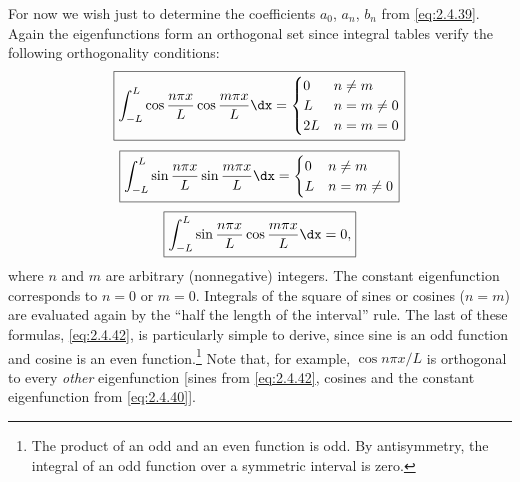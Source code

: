 For now we wish just to determine the coefficients $a_0$, $a_n$, $b_n$ from \eqref{eq:2.4.39}. Again the eigenfunctions form an orthogonal set since integral tables verify the following orthogonality conditions:
\begin{equation}
\label{eq:2.4.40}
\boxed{\int_{-L}^{L} \cos\frac{n\pi x}{L}\cos\frac{m\pi x}{L}\dx = \begin{cases} 0 & n \ne m \\ L & n = m \ne 0 \\ 2L & n = m = 0 \end{cases}}
\end{equation}
\begin{equation}
\label{eq:2.4.41}
\boxed{\int_{-L}^{L} \sin\frac{n\pi x}{L}\sin\frac{m\pi x}{L}\dx = \begin{cases} 0 & n \ne m \\ L & n = m \ne 0 \end{cases}}
\end{equation}
\begin{equation}
\label{eq:2.4.42}
\boxed{\int_{-L}^{L} \sin\frac{n\pi x}{L}\cos\frac{m\pi x}{L}\dx = 0,}
\end{equation}
where $n$ and $m$ are arbitrary (nonnegative) integers. The constant eigenfunction corresponds to $n = 0$ or $m = 0$. Integrals of the square of sines or cosines ($n = m$) are evaluated again by the ``half the length of the interval'' rule. The last of these formulas, \eqref{eq:2.4.42}, is particularly simple to derive, since sine is an odd function and cosine is an even function.\footnote{The product of an odd and an even function is odd. By antisymmetry, the integral of an odd function over a symmetric interval is zero.} Note that, for example, $\cos n\pi x/L$ is orthogonal to every \emph{other} eigenfunction [sines from \eqref{eq:2.4.42}, cosines and the constant eigenfunction from \eqref{eq:2.4.40}].

